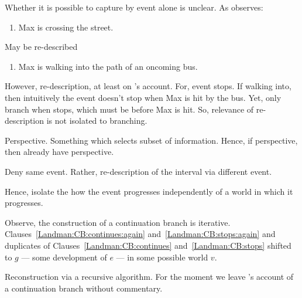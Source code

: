 \begin{note}
{    Whether it is possible to capture by event alone is unclear.
    As \textcite[1256]{Portner:2011vi} observes:
    \begin{enumerate}[label=\arabic*., ref=(\arabic*)]
    \item
      Max is crossing the street.
    \end{enumerate}
    May be re-described
    \begin{enumerate}[label=\arabic*\('\)., ref=(\arabic*\('\))]
    \item
      Max is walking into the path of an oncoming bus.
    \end{enumerate}

    However, re-description, at least on \citeauthor{Landman:1992wh}'s account.
    For, event stops.
    If walking into, then intuitively the event doesn't stop when Max is hit by the bus.
    Yet, only branch when stops, which must be before Max is hit.
    So, relevance of re-description is not isolated to branching.

    Perspective.
    Something which selects subset of information.%
    \footnotemark
    Hence, if perspective, then already have perspective.

    Deny same event.
    Rather, re-description of the interval via different event.

    Hence, isolate the how the event progresses independently of a world in which it progresses.
  }

  Observe, the construction of a continuation branch is iterative.
  Clauses~\ref{Landman:CB:continues:again} and~\ref{Landman:CB:stops:again} and duplicates of Clauses~\ref{Landman:CB:continues} and~\ref{Landman:CB:stops} shifted to \(g\) --- some development of \(e\) --- in some possible world \(v\).

  Reconstruction via a recursive algorithm.
  For the moment we leave \citeauthor{Landman:1992wh}'s account of a continuation branch without commentary.
\end{note}

